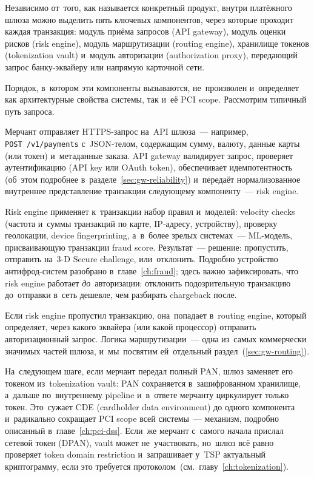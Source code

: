 Независимо от~того, как называется конкретный продукт, внутри
платёжного шлюза можно выделить пять ключевых компонентов, через
которые проходит каждая транзакция: модуль приёма запросов (API
gateway), модуль оценки рисков (risk engine), модуль маршрутизации
(routing engine), хранилище токенов (tokenization vault) и~модуль
авторизации (authorization proxy), передающий запрос банку-эквайеру
или напрямую карточной сети.

Порядок, в~котором эти компоненты вызываются, не~произволен
и~определяет как архитектурные свойства системы, так и~её PCI scope.
Рассмотрим типичный путь запроса.

Мерчант отправляет HTTPS-запрос на~API шлюза~--- например,
\texttt{POST~/{v1}/{payments}} с~JSON-телом, содержащим сумму, валюту,
данные карты (или токен) и~метаданные заказа. API gateway валидирует
запрос, проверяет аутентификацию (API key или OAuth token),
обеспечивает идемпотентность (об~этом подробнее в~разделе~\ref{sec:gw-reliability})
и~передаёт нормализованное внутреннее представление транзакции
следующему компоненту~--- risk engine.

Risk engine применяет к~транзакции набор правил и~моделей:
velocity checks (частота и~суммы транзакций по карте, IP-адресу,
устройству), проверку геолокации, device fingerprinting,
а~в~более зрелых системах~--- ML-модель, присваивающую транзакции
fraud score. Результат~--- решение: пропустить, отправить на~3-D Secure
challenge, или~отклонить. Подробно устройство антифрод-систем
разобрано в~главе~\ref{ch:fraud}; здесь важно зафиксировать,
что risk engine работает \emph{до}~авторизации: отклонить
подозрительную транзакцию до~отправки в~сеть дешевле, чем разбирать
chargeback после.

Если risk engine пропустил транзакцию, она~попадает в~routing engine,
который определяет, через какого эквайера (или какой процессор)
отправить авторизационный запрос. Логика маршрутизации~---
одна из~самых коммерчески значимых частей шлюза, и~мы~посвятим
ей~отдельный раздел~(\ref{sec:gw-routing}).

На~следующем шаге, если мерчант передал полный PAN, шлюз заменяет
его токеном из~tokenization vault: PAN сохраняется в~зашифрованном
хранилище, а~дальше по~внутреннему pipeline и~в~ответе мерчанту
циркулирует только токен. Это~сужает CDE (cardholder data environment)
до одного компонента и~радикально сокращает PCI scope всей
системы~--- механизм, подробно описанный
в~главе~\ref{ch:pci-dss}. Если~же мерчант с~самого начала прислал
сетевой токен (DPAN), vault может не~участвовать, но~шлюз всё равно
проверяет token domain restriction и~запрашивает у~TSP актуальный
криптограмму, если это требуется
протоколом~(см.~главу~\ref{ch:tokenization}).

